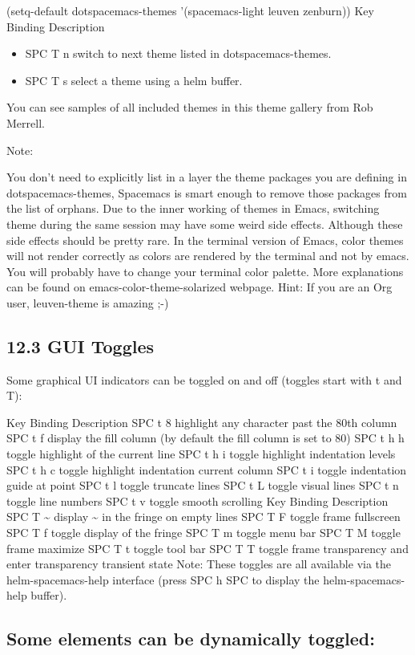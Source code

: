 \documentclass[11pt]{ctexart}
\begin{document}
(setq-default dotspacemacs-themes '(spacemacs-light leuven zenburn))
Key Binding	Description
\begin{itemize}
\item SPC T n	switch to next theme listed in dotspacemacs-themes.
\item SPC T s	select a theme using a helm buffer.
\end{itemize}
You can see samples of all included themes in this theme gallery from Rob Merrell.

Note:

You don't need to explicitly list in a layer the theme packages you are defining in dotspacemacs-themes, Spacemacs is smart enough to remove those packages from the list of orphans.
Due to the inner working of themes in Emacs, switching theme during the same session may have some weird side effects. Although these side effects should be pretty rare.
In the terminal version of Emacs, color themes will not render correctly as colors are rendered by the terminal and not by emacs. You will probably have to change your terminal color palette. More explanations can be found on emacs-color-theme-solarized webpage.
Hint: If you are an Org user, leuven-theme is amazing ;-)
\subsection{12.3 GUI Toggles}
\label{sec:org87768e5}

Some graphical UI indicators can be toggled on and off (toggles start with t and T):

Key Binding	Description
SPC t 8	highlight any character past the 80th column
SPC t f	display the fill column (by default the fill column is set to 80)
SPC t h h	toggle highlight of the current line
SPC t h i	toggle highlight indentation levels
SPC t h c	toggle highlight indentation current column
SPC t i	toggle indentation guide at point
SPC t l	toggle truncate lines
SPC t L	toggle visual lines
SPC t n	toggle line numbers
SPC t v	toggle smooth scrolling
Key Binding	Description
SPC T \textasciitilde{}	display \textasciitilde{} in the fringe on empty lines
SPC T F	toggle frame fullscreen
SPC T f	toggle display of the fringe
SPC T m	toggle menu bar
SPC T M	toggle frame maximize
SPC T t	toggle tool bar
SPC T T	toggle frame transparency and enter transparency transient state
Note: These toggles are all available via the helm-spacemacs-help interface (press SPC h SPC to display the helm-spacemacs-help buffer).

\subsection{Some elements can be dynamically toggled:}
\label{sec:org98d9930}
\end{document}
